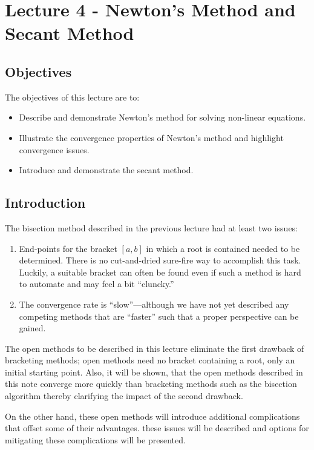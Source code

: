 \chapter{Lecture 4 - Newton's Method and Secant Method}
\label{ch:lec4n}
\section{Objectives}
The objectives of this lecture are to:
\begin{itemize}
\item Describe and demonstrate Newton's method for solving non-linear equations.
\item Illustrate the convergence properties of Newton's method and highlight convergence issues.
\item Introduce and demonstrate the secant method.
\end{itemize}
\setcounter{lstannotation}{0}

\section{Introduction}
The bisection method described in the previous lecture had at least two issues:
\begin{enumerate}
\item End-points for the bracket $\left[a,b\right]$ in which a root is contained needed to be determined.  There is no cut-and-dried sure-fire way to accomplish this task.  Luckily, a suitable bracket can often be found even if such a method is hard to automate and may feel a bit ``cluncky.''

\item The convergence rate is ``slow''---although we have not yet described any competing methods that are ``faster'' such that a proper perspective can be gained.
\end{enumerate}
The open methods to be described in this lecture eliminate the first drawback of bracketing methods; open methods need no bracket containing a root, only an initial starting point.  Also, it will be shown, that the open methods described in this note converge more quickly than bracketing methods such as the bisection algorithm thereby clarifying the impact of the second drawback. 

On the other hand, these open methods will introduce additional complications that offset some of their advantages.  these issues will be described and options for mitigating these complications will be presented.

